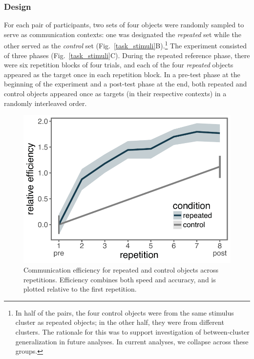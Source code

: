 \documentclass[10pt,letterpaper]{article}
\begin{document}
\subsubsection{Design}
For each pair of participants, two sets of four objects were randomly sampled to serve as communication contexts: one was designated the \emph{repeated} set while the other served as the \emph{control} set (Fig.~\ref{task_stimuli}B).\footnote{In half of the pairs, the four control objects were from the same stimulus cluster as repeated objects; in the other half, they were from different clusters. The rationale for this was to support investigation of between-cluster generalization in future analyses. In current analyses, we collapse across these groups.} %
The experiment consisted of three phases (Fig.~\ref{task_stimuli}C).
During the repeated reference phase, there were six repetition blocks of four trials, and each of the four \emph{repeated} objects appeared as the target once in each repetition block.
In a pre-test phase at the beginning of the experiment and a post-test phase at the end, both repeated and control objects appeared once as targets (in their respective contexts) in a randomly interleaved order.

\begin{figure}
\begin{center}
\includegraphics[width=0.84\linewidth]{figures/refgame_BIS_timeseries.pdf}
\caption{Communication efficiency for repeated and control objects across repetitions. Efficiency combines both speed and accuracy, and is plotted relative to the first repetition.}
\label{refgame_bis}
\end{center}
\end{figure}
\end{document}
